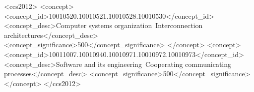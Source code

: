\documentclass[sigplan]{acmart}
\begin{document}
\author{Jacob Nelson}

\author{Olli Saarikivi}


%

\renewcommand{\shortauthors}{Zixian Cai, Zhengyang Liu \etal}

\begin{abstract}

\end{abstract}


\begin{CCSXML}
<ccs2012>
<concept>
<concept_id>10010520.10010521.10010528.10010530</concept_id>
<concept_desc>Computer systems organization~Interconnection architectures</concept_desc>
<concept_significance>500</concept_significance>
</concept>
<concept>
<concept_id>10011007.10010940.10010971.10010972.10010973</concept_id>
<concept_desc>Software and its engineering~Cooperating communicating processes</concept_desc>
<concept_significance>500</concept_significance>
</concept>
</ccs2012>
\end{CCSXML}


\end{document}
